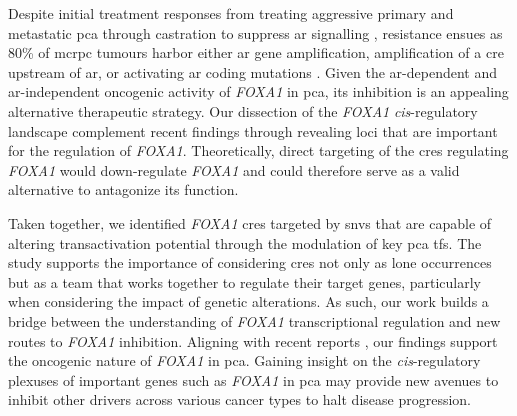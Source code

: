 Despite initial treatment responses from treating aggressive primary and metastatic \gls{pca} through castration to suppress \gls{ar} signalling \cite{attardProstateCancer2016}, resistance ensues as 80\% of \gls{mcrpc} tumours harbor either \gls{ar} gene amplification, amplification of a \gls{cre} upstream of \gls{ar}, or activating \gls{ar} coding mutations \cite{robinsonIntegrativeClinicalGenomics2015,takedaSomaticallyAcquiredEnhancer2018,quigleyGenomicHallmarksStructural2018}.
Given the \gls{ar}-dependent \cite{yangCurrentPerspectivesFOXA12015,pomerantzAndrogenReceptorCistrome2015} and \gls{ar}-independent \cite{sunkelIntegrativeAnalysisIdentifies2017} oncogenic activity of \emph{FOXA1} in \gls{pca}, its inhibition is an appealing alternative therapeutic strategy.
Our dissection of the \emph{FOXA1} \emph{cis}-regulatory landscape complement recent findings through revealing loci that are important for the regulation of \emph{FOXA1}.
Theoretically, direct targeting of the \glspl{cre} regulating \emph{FOXA1} would down-regulate \emph{FOXA1} and could therefore serve as a valid alternative to antagonize its function.

Taken together, we identified \emph{FOXA1} \glspl{cre} targeted by \glspl{snv} that are capable of altering transactivation potential through the modulation of key \gls{pca} \glspl{tf}.
The study supports the importance of considering \glspl{cre} not only as lone occurrences but as a team that works together to regulate their target genes, particularly when considering the impact of genetic alterations.
As such, our work builds a bridge between the understanding of \emph{FOXA1} transcriptional regulation and new routes to \emph{FOXA1} inhibition.
Aligning with recent reports \cite{paroliaDistinctStructuralClasses2019,adamsFOXA1MutationsAlter2019,gaoForkheadDomainMutations2019}, our findings support the oncogenic nature of \emph{FOXA1} in \gls{pca}.
Gaining insight on the \emph{cis}-regulatory plexuses of important genes such as \emph{FOXA1} in \gls{pca} may provide new avenues to inhibit other drivers across various cancer types to halt disease progression.

